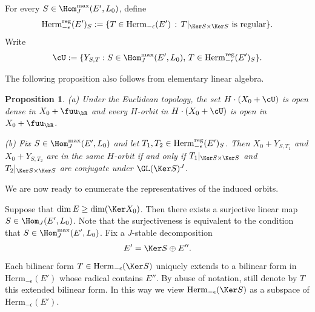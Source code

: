 \documentclass[11pt,a4paper]{amsart}
\newcommand{\be}{\begin {equation}}
\newcommand{\ee}{\end {equation}}
\numberwithin{equation}{section}
\newtheorem{prop}[thm]{Proposition}
\theoremstyle{remark}
\begin{document}
For every  $S\in \Hom_J^{\max}(E',L_0)$, define 
\[
\Herm_{-\epsilon}^{\mathrm{reg}}(E')_S := \{T \in \Herm_{-\epsilon}(E') \,:\, 
T|_{\Ker S\times \Ker S} \text{ is regular}\}.
\]
Write 
\[
\cU := \{Y_{S,T} : S\in \Hom_J^{\max}(E', L_0),\, T \in \Herm^{\mathrm{reg}}_{-\epsilon}(E')_S
\}.
\]


The following proposition also follows from elementary linear algebra. 

\begin{prop}\label{prop:A5}
\noindent (a) Under the Euclidean topology, the set $H\cdot  (X_0 + \cU)$ is open dense in $X_0 + \fuu_\bR$ and  every  $H$-orbit in $H\cdot (X_0+ \cU)$ is open in $X_0 + \fuu_\bR$.  

\noindent (b) 
Fix $S\in \Hom_J^{\max}(E', L_0)$ and let $T_1, T_2 \in \mathrm{Herm}_{-\epsilon}^{\mathrm{reg}}(E')_S$. Then 
$X_0 + Y_{S,T_1}$ and $X_0 + Y_{S,T_2}$ are in the same $H$-orbit 
if and only if $T_1|_{\Ker S\times \Ker S}$ and $T_2 |_{\Ker S\times \Ker S}$ are conjugate under $\GL(\Ker S)^J$. 
\end{prop}

We are now ready to enumerate the representatives of the induced orbits. 


Suppose that $\dim E \geq \dim (\Ker X_0)$. Then there exists a surjective linear map $S\in \Hom_J(E', L_0)$. Note that the surjectiveness is equivalent to the condition that  $S\in \Hom_J^{\max}(E',L_0)$. 
Fix a $J$-stable decomposition 
\be\label{decep}
E' = \Ker S \oplus E''.
\ee
 Each  bilinear form $T \in \mathrm{Herm}_{-\epsilon}(\Ker S)$ uniquely extends to a bilinear form in $\mathrm{Herm}_{-\epsilon}(E')$ whose radical contains $E''$. By abuse of notation, still denote by $T$ this extended bilinear form. In this way we view $\mathrm{Herm}_{-\epsilon}(\Ker S)$ as a subspace of $\mathrm{Herm}_{-\epsilon}(E')$. 
 
\end{document}
